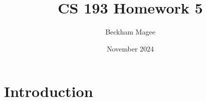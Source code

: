 \documentclass{article}
\title{CS 193 Homework 5}
\author{Beckham Magee}
\date{November 2024}
\begin{document}
\maketitle

\section{Introduction}
\end{document}
